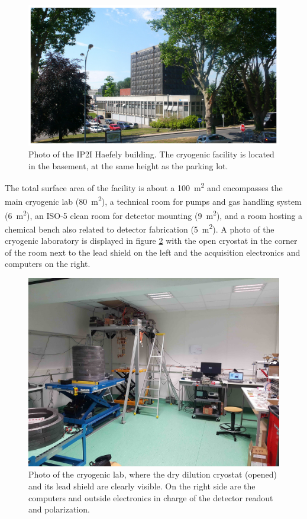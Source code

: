 \begin{figure}
\centering
\includegraphics[width=\textwidth,angle=0]{Figures/Experiment/haefely_building.png}
\caption{Photo of the IP2I Haefely building. The cryogenic facility is located in the basement, at the same height as the parking lot.}
\label{fig:haefely-building}
\end{figure}

The total surface area of the facility is about a \SI{100}{\m^2} and encompasses the main cryogenic lab (\SI{80}{\m^2}), a technical room for pumps and gas handling system (\SI{6}{\m^2}), an ISO-5 clean room for detector mounting (\SI{9}{\m^2}), and a room hosting a chemical bench also related to detector fabrication (\SI{5}{\m^2}). A photo of the cryogenic laboratory is displayed in figure \ref{fig:cryolab} with the open cryostat in the corner of the room next to the lead shield on the left and the acquisition electronics and computers on the right.

\begin{figure}
\begin{center}
\includegraphics[width=\textwidth,angle=0]{Figures/Experiment/ip2i_cryogenic_facility.jpg}
\caption{Photo of the cryogenic lab, where the dry dilution cryostat (opened) and its lead shield are clearly visible. 
On the right side are the computers and outside electronics in charge of the detector readout and polarization.}
\label{fig:cryolab}
\end{center}
\end{figure}

